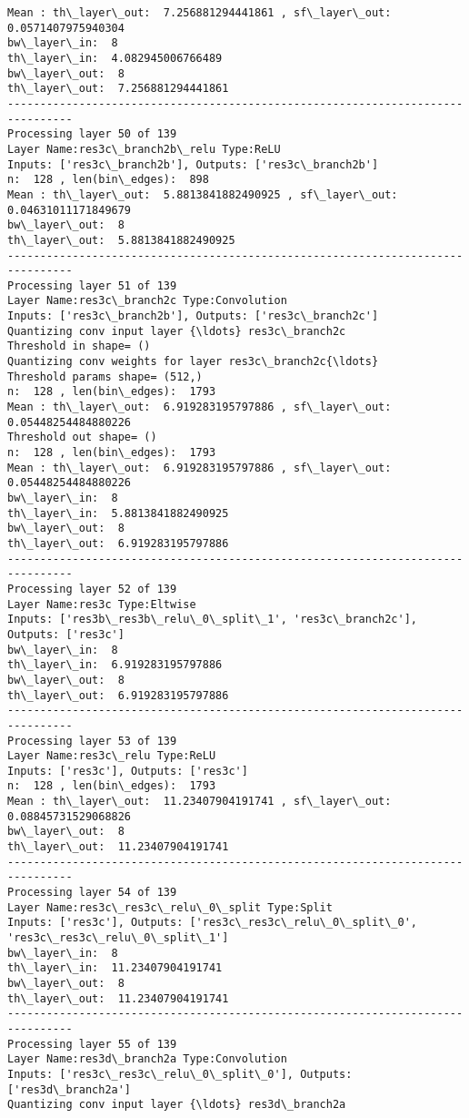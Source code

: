 \documentclass[11pt]{article}
\begin{document}
\begin{Verbatim}[commandchars=\\\{\}]
Mean : th\_layer\_out:  7.256881294441861 , sf\_layer\_out:  0.0571407975940304
bw\_layer\_in:  8
th\_layer\_in:  4.082945006766489
bw\_layer\_out:  8
th\_layer\_out:  7.256881294441861
--------------------------------------------------------------------------------
Processing layer 50 of 139
Layer Name:res3c\_branch2b\_relu Type:ReLU
Inputs: ['res3c\_branch2b'], Outputs: ['res3c\_branch2b']
n:  128 , len(bin\_edges):  898
Mean : th\_layer\_out:  5.8813841882490925 , sf\_layer\_out:  0.04631011171849679
bw\_layer\_out:  8
th\_layer\_out:  5.8813841882490925
--------------------------------------------------------------------------------
Processing layer 51 of 139
Layer Name:res3c\_branch2c Type:Convolution
Inputs: ['res3c\_branch2b'], Outputs: ['res3c\_branch2c']
Quantizing conv input layer {\ldots} res3c\_branch2c
Threshold in shape= ()
Quantizing conv weights for layer res3c\_branch2c{\ldots}
Threshold params shape= (512,)
n:  128 , len(bin\_edges):  1793
Mean : th\_layer\_out:  6.919283195797886 , sf\_layer\_out:  0.05448254484880226
Threshold out shape= ()
n:  128 , len(bin\_edges):  1793
Mean : th\_layer\_out:  6.919283195797886 , sf\_layer\_out:  0.05448254484880226
bw\_layer\_in:  8
th\_layer\_in:  5.8813841882490925
bw\_layer\_out:  8
th\_layer\_out:  6.919283195797886
--------------------------------------------------------------------------------
Processing layer 52 of 139
Layer Name:res3c Type:Eltwise
Inputs: ['res3b\_res3b\_relu\_0\_split\_1', 'res3c\_branch2c'], Outputs: ['res3c']
bw\_layer\_in:  8
th\_layer\_in:  6.919283195797886
bw\_layer\_out:  8
th\_layer\_out:  6.919283195797886
--------------------------------------------------------------------------------
Processing layer 53 of 139
Layer Name:res3c\_relu Type:ReLU
Inputs: ['res3c'], Outputs: ['res3c']
n:  128 , len(bin\_edges):  1793
Mean : th\_layer\_out:  11.23407904191741 , sf\_layer\_out:  0.08845731529068826
bw\_layer\_out:  8
th\_layer\_out:  11.23407904191741
--------------------------------------------------------------------------------
Processing layer 54 of 139
Layer Name:res3c\_res3c\_relu\_0\_split Type:Split
Inputs: ['res3c'], Outputs: ['res3c\_res3c\_relu\_0\_split\_0', 'res3c\_res3c\_relu\_0\_split\_1']
bw\_layer\_in:  8
th\_layer\_in:  11.23407904191741
bw\_layer\_out:  8
th\_layer\_out:  11.23407904191741
--------------------------------------------------------------------------------
Processing layer 55 of 139
Layer Name:res3d\_branch2a Type:Convolution
Inputs: ['res3c\_res3c\_relu\_0\_split\_0'], Outputs: ['res3d\_branch2a']
Quantizing conv input layer {\ldots} res3d\_branch2a

\end{Verbatim}
\end{document}
